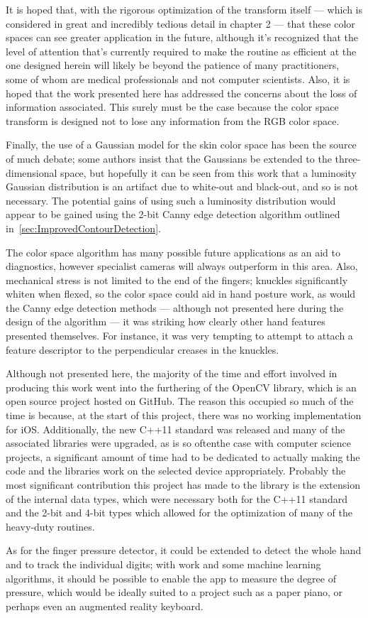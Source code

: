 It is hoped that, with the rigorous optimization of the transform itself --- which is considered in great and incredibly tedious detail in chapter 2 --- that these color spaces can see greater application in the future, although it's recognized that the level of attention that's currently required to make the routine as efficient at the one designed herein will likely be beyond the patience of many practitioners, some of whom are medical professionals and not computer scientists. Also, it is hoped that the work presented here has addressed the concerns about the loss of information associated. This surely must be the case because the color space transform is designed not to lose any information from the RGB color space.

Finally, the use of a Gaussian model for the skin color space has been the source of much debate; some authors insist that the Gaussians be extended to the three-dimensional space, but hopefully it can be seen from this work that a luminosity Gaussian distribution is an artifact due to white-out and black-out, and so is not necessary. The potential gains of using such a luminosity distribution would appear to be gained using the 2-bit Canny edge detection algorithm outlined in~\ref{sec:ImprovedContourDetection}.

The color space algorithm has many possible future applications as an aid to diagnostics, however specialist cameras will always outperform in this area. Also, mechanical stress is not limited to the end of the fingers; knuckles significantly whiten when flexed, so the color space could aid in hand posture work, as would the Canny edge detection methods --- although not presented here during the design of the algorithm --- it was striking how clearly other hand features presented themselves. For instance, it was very tempting to attempt to attach a feature descriptor to the perpendicular creases in the knuckles.

Although not presented here, the majority of the time and effort involved in producing this work went into the furthering of the OpenCV library, which is an open source project hosted on GitHub. The reason this occupied so much of the time is because, at the start of this project, there was no working implementation for iOS. Additionally, the new C++11 standard was released and many of the associated libraries were upgraded, as is so oftenthe case with computer science projects, a significant amount of time had to be dedicated to actually making the code and the libraries work on the selected device appropriately. Probably the most significant contribution this project has made to the library is the extension of the internal data types, which were necessary both for the C++11 standard and the 2-bit and 4-bit types which allowed for the optimization of many of the heavy-duty routines.

As for the finger pressure detector, it could be extended to detect the whole hand and to track the individual digits; with work and some machine learning algorithms, it should be possible to enable the app to measure the degree of pressure, which would be ideally suited to a project such as a paper piano, or perhaps even an augmented reality keyboard.